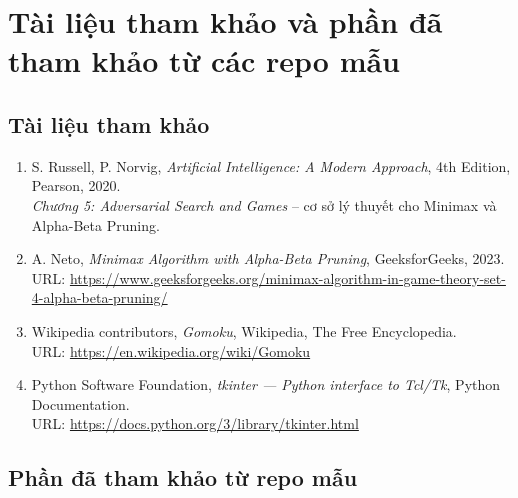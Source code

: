 \documentclass[12pt,a4paper]{article}
\begin{document}
\section{Tài liệu tham khảo và phần đã tham khảo từ các repo mẫu}

\subsection{Tài liệu tham khảo}

\begin{enumerate}
    \item S. Russell, P. Norvig, \textit{Artificial Intelligence: A Modern Approach}, 4th Edition, Pearson, 2020. \\
    \textit{Chương 5: Adversarial Search and Games} -- cơ sở lý thuyết cho Minimax và Alpha-Beta Pruning.

    \item A. Neto, \textit{Minimax Algorithm with Alpha-Beta Pruning}, GeeksforGeeks, 2023. \\
    URL: \url{https://www.geeksforgeeks.org/minimax-algorithm-in-game-theory-set-4-alpha-beta-pruning/}

    \item Wikipedia contributors, \textit{Gomoku}, Wikipedia, The Free Encyclopedia. \\
    URL: \url{https://en.wikipedia.org/wiki/Gomoku}

    \item Python Software Foundation, \textit{tkinter --- Python interface to Tcl/Tk}, Python Documentation. \\
    URL: \url{https://docs.python.org/3/library/tkinter.html}
\end{enumerate}

\subsection{Phần đã tham khảo từ repo mẫu}
\end{document}
